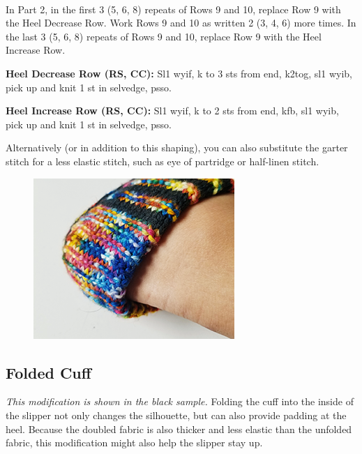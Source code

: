 \documentclass[12pt]{article}
\newcommand{\rowDir}[1]{\textbf{#1:}} %
\begin{document}
~\\
In Part 2, in the first 3 (5, 6, 8) repeats of Rows 9 and 10, replace Row 9 with the Heel Decrease Row. Work Rows 9 and 10 as written 2 (3, 4, 6) more times. In the last 3 (5, 6, 8) repeats of Rows 9 and 10, replace Row 9 with the Heel Increase Row.

\rowDir{Heel Decrease Row (RS, CC)} Sl1 wyif, k to 3 sts from end, k2tog, sl1 wyib, pick up and knit 1 st in selvedge, psso.

\rowDir{Heel Increase Row (RS, CC)} Sl1 wyif, k to 2 sts from end, kfb, sl1 wyib, pick up and knit 1 st in selvedge, psso.

Alternatively (or in addition to this shaping), you can also substitute the garter stitch for a less elastic stitch, such as eye of partridge or half-linen stitch.

\vspace{-1em}
\begin{figure}
\vspace{1em}
\includegraphics[width=\linewidth]{./photos/smallVersions/black_foldedcuff.png}
\vspace{-4em}
\end{figure} \leavevmode

\subsection*{Folded Cuff}

\emph{This modification is shown in the black sample.} Folding the cuff into the inside of the slipper not only changes the silhouette, but can also provide padding at the heel. Because the doubled fabric is also thicker and less elastic than the unfolded fabric, this modification might also help the slipper stay up.
\end{document}
